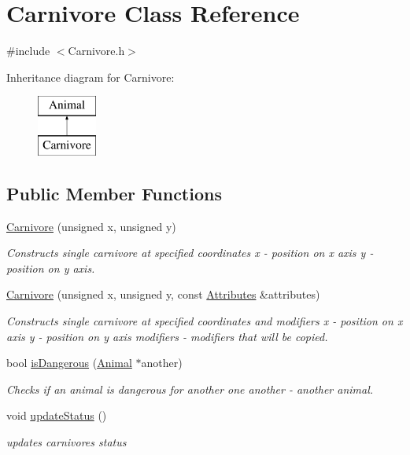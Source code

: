 \hypertarget{class_carnivore}{}\section{Carnivore Class Reference}
\label{class_carnivore}


{\ttfamily \#include $<$Carnivore.\+h$>$}

Inheritance diagram for Carnivore\+:\begin{figure}[H]
\begin{center}
\leavevmode
\includegraphics[height=2.000000cm]{class_carnivore}
\end{center}
\end{figure}
\subsection*{Public Member Functions}
\begin{DoxyCompactItemize}
\item 
\hyperlink{class_carnivore_a8c55205bb6dadd456cebcb0b9b798e3f}{Carnivore} (unsigned x, unsigned y)
\begin{DoxyCompactList}\small\item\em Constructs single carnivore at specified coordinates  x -\/ position on x axis  y -\/ position on y axis. \end{DoxyCompactList}\item 
\hyperlink{class_carnivore_a877b1801c58da376cc0e2119f67492af}{Carnivore} (unsigned x, unsigned y, const \hyperlink{class_attributes}{Attributes} \&attributes)
\begin{DoxyCompactList}\small\item\em Constructs single carnivore at specified coordinates and modifiers  x -\/ position on x axis  y -\/ position on y axis  modifiers -\/ modifiers that will be copied. \end{DoxyCompactList}\item 
bool \hyperlink{class_carnivore_a6119646adbb63f861d7a8f873e03086c}{is\+Dangerous} (\hyperlink{class_animal}{Animal} $\ast$another)
\begin{DoxyCompactList}\small\item\em Checks if an animal is dangerous for another one  another -\/ another animal. \end{DoxyCompactList}\item 
void \hyperlink{class_carnivore_a34c97ab897ebe2454390997fb49e5f90}{update\+Status} ()
\begin{DoxyCompactList}\small\item\em updates carnivore\textquotesingle{}s status \end{DoxyCompactList}\end{DoxyCompactItemize}
